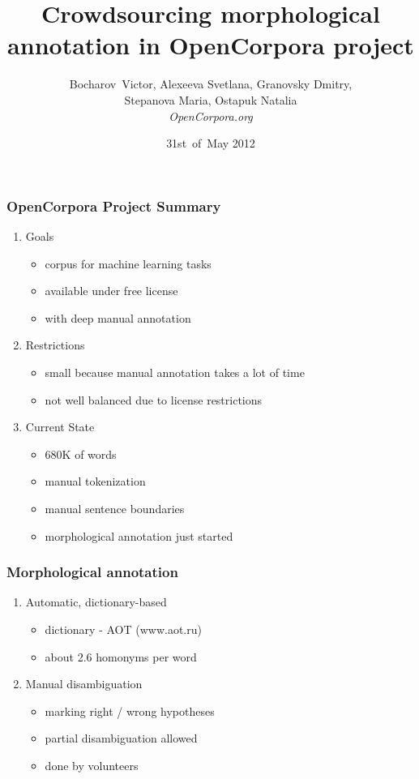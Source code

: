\documentclass{beamer}
\title{Crowdsourcing morphological annotation in OpenCorpora project}
\author{Bocharov~Victor, Alexeeva Svetlana, Granovsky Dmitry,\\Stepanova Maria, Ostapuk Natalia\\\small\it OpenCorpora.org}
\date{31st~of~May 2012}
\begin{document}
\maketitle

\begin{frame}
\frametitle{OpenCorpora Project Summary}
\begin{enumerate}
\item{Goals}
    \begin{itemize}
    \item{corpus for machine learning tasks}
    \item{available under free license}
    \item{with deep manual annotation}
    \end{itemize}
    \pause
\item{Restrictions}
    \begin{itemize}
    \item{small because manual annotation takes a lot of time}
    \item{not well balanced due to license restrictions}
    \end{itemize}
    \pause
\item{Current State}
    \begin{itemize}
    \item{680K of words}
    \item{manual tokenization}
    \item{manual sentence boundaries}
    \item{morphological annotation just started}
    \end{itemize}
\end{enumerate}
\end{frame}

\begin{frame}
\frametitle{Morphological annotation}
\begin{enumerate}
\item{Automatic, dictionary-based}
    \begin{itemize}
    \item{dictionary - AOT (www.aot.ru)}
    \item{about 2.6 homonyms per word}
    \end{itemize}
\item{Manual disambiguation}
    \begin{itemize}
    \item{marking right / wrong hypotheses}
    \item{partial disambiguation allowed}
    \item{done by volunteers}
    \end{itemize}
\end{enumerate}
\end{frame}
\end{document}

